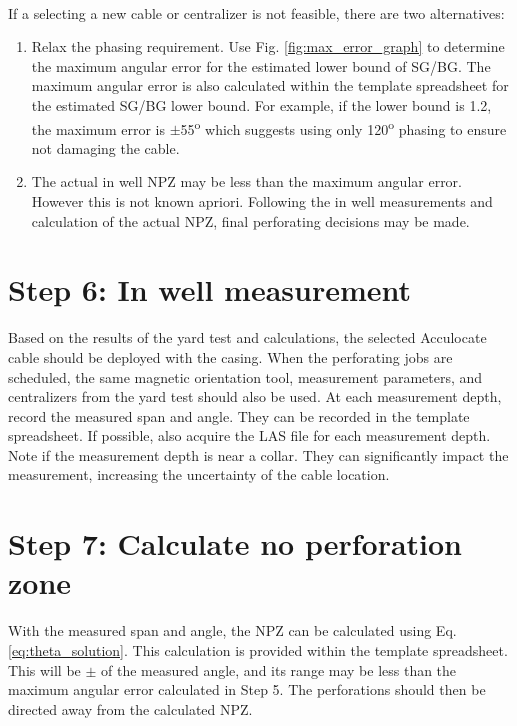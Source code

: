 \documentclass[paper=a4, fontsize=11pt]{scrartcl}
\numberwithin{equation}{section}		%
\numberwithin{figure}{section}			%
\numberwithin{table}{section}				%
\begin{document}
\paragraph{}
If a selecting a new cable or centralizer is not feasible, there are two alternatives: 
\begin{enumerate}
    \item Relax the phasing requirement.  Use Fig. \ref{fig:max_error_graph} to determine the maximum angular error for the estimated lower bound of SG/BG.  The maximum angular error is also calculated within the template spreadsheet for the estimated SG/BG lower bound.  For example, if the lower bound is 1.2, the maximum error is $\pm$55\textsuperscript{o} which suggests using only 120\textsuperscript{o} phasing to ensure not damaging the cable.
    \item The actual in well NPZ may be less than the maximum angular error.  However this is not known apriori.  Following the in well measurements and calculation of the actual NPZ, final perforating decisions may be made.  
\end{enumerate}

\section{Step 6: In well measurement}
Based on the results of the yard test and calculations, the selected Acculocate cable should be deployed with the casing.  When the perforating jobs are scheduled, the same magnetic orientation tool, measurement parameters, and centralizers from the yard test should also be used.  At each measurement depth, record the measured span and angle.  They can be recorded in the template spreadsheet.  If possible, also acquire the LAS file for each measurement depth.  Note if the measurement depth is near a collar.  They can significantly impact the measurement, increasing the uncertainty of the cable location.  

\section{Step 7: Calculate no perforation zone}\label{section:step_7}
With the measured span and angle, the NPZ can be calculated using Eq.\ref{eq:theta_solution}.  This calculation is provided within the template spreadsheet.  This will be $\pm$ of the measured angle, and its range may be less than the maximum angular error calculated in Step 5.  The perforations should then be directed away from the calculated NPZ. 
\end{document}
